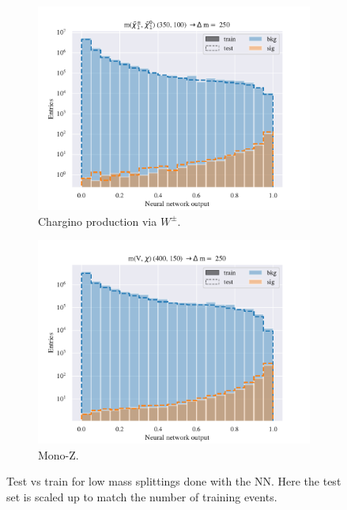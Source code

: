 \begin{figure}[H]
    \begin{subfigure}[t!]{0.49\textwidth}
        \includegraphics[width = \textwidth]{Figures/WW/NN/All_level/Inter/scaled_train_test_395320.pdf}
        \caption{Chargino production via $W^\pm$.}
        \label{fig:WWNNInter}
    \end{subfigure}
    \begin{subfigure}[t!]{0.49\textwidth}
        \includegraphics[width = \textwidth]{Figures/Mono_Z/ML/NN/All_level/Inter/scaled_train_test_310613.pdf}
        \caption{Mono-Z.}
        \label{fig:MonoZNNInter}
    \end{subfigure}
    \caption{Test vs train for low mass splittings done with the NN. Here the test set is scaled up to match the number of training events.}
    \label{fig:AllInterNN}
\end{figure}

